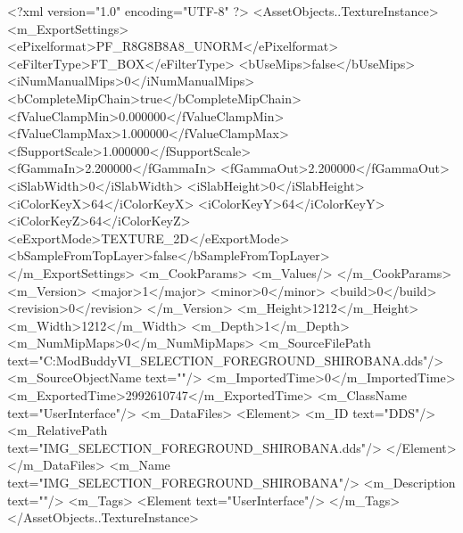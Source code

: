 <?xml version="1.0" encoding="UTF-8" ?>
<AssetObjects..TextureInstance>
	<m_ExportSettings>
		<ePixelformat>PF_R8G8B8A8_UNORM</ePixelformat>
		<eFilterType>FT_BOX</eFilterType>
		<bUseMips>false</bUseMips>
		<iNumManualMips>0</iNumManualMips>
		<bCompleteMipChain>true</bCompleteMipChain>
		<fValueClampMin>0.000000</fValueClampMin>
		<fValueClampMax>1.000000</fValueClampMax>
		<fSupportScale>1.000000</fSupportScale>
		<fGammaIn>2.200000</fGammaIn>
		<fGammaOut>2.200000</fGammaOut>
		<iSlabWidth>0</iSlabWidth>
		<iSlabHeight>0</iSlabHeight>
		<iColorKeyX>64</iColorKeyX>
		<iColorKeyY>64</iColorKeyY>
		<iColorKeyZ>64</iColorKeyZ>
		<eExportMode>TEXTURE_2D</eExportMode>
		<bSampleFromTopLayer>false</bSampleFromTopLayer>
	</m_ExportSettings>
	<m_CookParams>
		<m_Values/>
	</m_CookParams>
	<m_Version>
		<major>1</major>
		<minor>0</minor>
		<build>0</build>
		<revision>0</revision>
	</m_Version>
	<m_Height>1212</m_Height>
	<m_Width>1212</m_Width>
	<m_Depth>1</m_Depth>
	<m_NumMipMaps>0</m_NumMipMaps>
	<m_SourceFilePath text="C:\Users\asus\Documents\Firaxis ModBuddy\Civilization VI\temppic\IMG_SELECTION_FOREGROUND_SHIROBANA.dds"/>
	<m_SourceObjectName text=""/>
	<m_ImportedTime>0</m_ImportedTime>
	<m_ExportedTime>2992610747</m_ExportedTime>
	<m_ClassName text="UserInterface"/>
	<m_DataFiles>
		<Element>
			<m_ID text="DDS"/>
			<m_RelativePath text="IMG_SELECTION_FOREGROUND_SHIROBANA.dds"/>
		</Element>
	</m_DataFiles>
	<m_Name text="IMG_SELECTION_FOREGROUND_SHIROBANA"/>
	<m_Description text=""/>
	<m_Tags>
		<Element text="UserInterface"/>
	</m_Tags>
</AssetObjects..TextureInstance>

